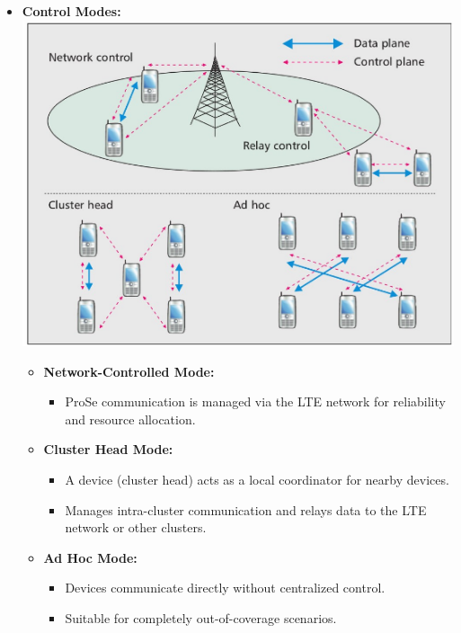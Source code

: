 \begin{itemize}
    \item \textbf{Control Modes:}\\
    \includegraphics[width=0.5\columnwidth]{Resources/prose2.png} 
    \begin{itemize}
        \item \textbf{Network-Controlled Mode:}
        \begin{itemize}
            \item ProSe communication is managed via the LTE network for reliability and resource allocation.
        \end{itemize}
        \item \textbf{Cluster Head Mode:}
        \begin{itemize}
            \item A device (cluster head) acts as a local coordinator for nearby devices.
            \item Manages intra-cluster communication and relays data to the LTE network or other clusters.
        \end{itemize}
        \item \textbf{Ad Hoc Mode:}
        \begin{itemize}
            \item Devices communicate directly without centralized control.
            \item Suitable for completely out-of-coverage scenarios.
        \end{itemize}
    \end{itemize}


\end{itemize}

